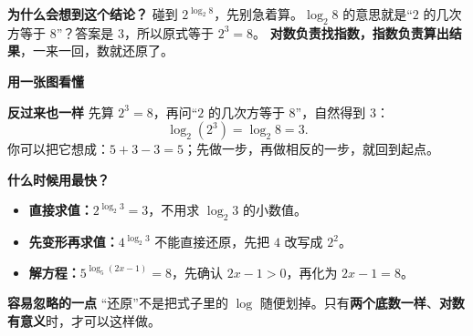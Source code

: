 \begin{explanationbox}
	\textbf{\textcolor{CExplanation}{为什么会想到这个结论？}}
	碰到 $2^{\log_2 8}$，先别急着算。$\log_2 8$ 的意思就是“$2$ 的几次方等于 $8$”？答案是 $3$，所以原式等于 $2^3=8$。
	\textbf{对数负责找指数，指数负责算出结果}，一来一回，数就还原了。

	\medskip
	\textbf{\textcolor{CExplanation}{用一张图看懂}}
	\begin{center}
	
	\end{center}

	\textbf{\textcolor{CExplanation}{反过来也一样}}
	先算 $2^3=8$，再问“$2$ 的几次方等于 $8$”，自然得到 $3$：
	\[
		\log_2(2^3)=\log_2 8=3.
	\]
	你可以把它想成：$5+3-3=5$；先做一步，再做相反的一步，就回到起点。

	\medskip
	\textbf{\textcolor{CExplanation}{什么时候用最快？}}
	\begin{itemize}[leftmargin=*, itemsep=0.35em, topsep=0.2em]
		\item \textbf{直接求值：}$2^{\log_2 3}=3$，不用求 $\log_2 3$ 的小数值。
		\item \textbf{先变形再求值：}$4^{\log_2 3}$ 不能直接还原，先把 $4$ 改写成 $2^2$。
		\item \textbf{解方程：}$5^{\log_5(2x-1)}=8$，先确认 $2x-1>0$，再化为 $2x-1=8$。
	\end{itemize}

	\textbf{\textcolor{CExplanation}{容易忽略的一点}}
	“还原”不是把式子里的 $\log$ 随便划掉。只有\textbf{两个底数一样}、\textbf{对数有意义}时，才可以这样做。
\end{explanationbox}
